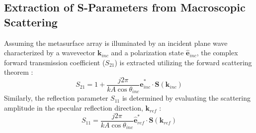 \documentclass[11pt,a4paper]{article}
\begin{document}
\subsection{Extraction of S-Parameters from Macroscopic Scattering} \label{subsec:sparameters}
Assuming the metasurface array is illuminated by an incident plane wave characterized by a wavevector $\mathbf{k}_{inc}$ and a polarization state $\hat{\mathbf{e}}_{inc}$, the complex forward transmission coefficient ($S_{21}$) is extracted utilizing the forward scattering theorem \cite{jackson1999classical, mishchenko2002scattering}:
\begin{equation}
    S_{21} = 1 + \frac{j 2\pi}{k A \cos\theta_{inc}} \hat{\mathbf{e}}_{inc}^* \cdot \mathbf{S}(\mathbf{k}_{inc})
    \label{eq:s21_transmission}
\end{equation}
Similarly, the reflection parameter $S_{11}$ is determined by evaluating the scattering amplitude in the specular reflection direction, $\mathbf{k}_{ref}$ \cite{jackson1999classical}:
\begin{equation}
    S_{11} = \frac{j 2\pi}{k A \cos\theta_{inc}} \hat{\mathbf{e}}_{ref}^* \cdot \mathbf{S}(\mathbf{k}_{ref})
    \label{eq:s11_reflection}
\end{equation}



\end{document}

